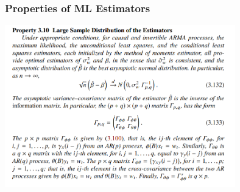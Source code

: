 \documentclass[%
xcolor=pdftex]{beamer}
\begin{document}
\begin{frame}
\frametitle{Properties of ML Estimators}

\includegraphics[width=100mm]{screenshot.png}

\end{frame}
\end{document}
